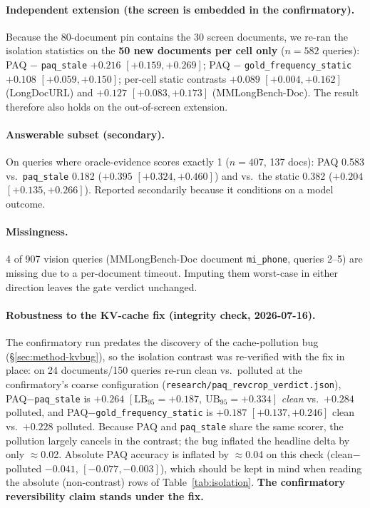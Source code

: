 \documentclass[11pt,letterpaper]{article}
\newcommand{\paq}{\textsc{PAQ}}
\newcommand{\lb}{\mathrm{LB}_{95}}
\begin{document}
\paragraph{Independent extension (the screen is embedded in the confirmatory).} Because the
80-document pin contains the 30 screen documents, we re-ran the isolation statistics on the
\textbf{50 new documents per cell only} ($n=582$ queries): \paq{} $-$ \texttt{paq\_stale}
$+0.216$ $[+0.159,+0.269]$; \paq{} $-$ \texttt{gold\_frequency\_static} $+0.108$
$[+0.059,+0.150]$; per-cell static contrasts $+0.089$ $[+0.004,+0.162]$ (LongDocURL) and
$+0.127$ $[+0.083,+0.173]$ (MMLongBench-Doc). The result therefore also holds on the
out-of-screen extension.

\paragraph{Answerable subset (secondary).} On queries where oracle-evidence scores exactly 1
($n=407$, 137 docs): \paq{} 0.583 vs.\ \texttt{paq\_stale} 0.182 ($+0.395$ $[+0.324,+0.460]$)
and vs.\ the static 0.382 ($+0.204$ $[+0.135,+0.266]$). Reported secondarily because it
conditions on a model outcome.

\label{sec:results-missing}
\paragraph{Missingness.} 4 of 907 vision queries (MMLongBench-Doc document \texttt{mi\_phone},
queries 2--5) are missing due to a per-document timeout. Imputing them worst-case in either
direction leaves the gate verdict unchanged.

\paragraph{Robustness to the KV-cache fix (integrity check, 2026-07-16).} The confirmatory run
predates the discovery of the cache-pollution bug (\S\ref{sec:method-kvbug}), so the isolation
contrast was re-verified with the fix in place: on 24 documents/150 queries re-run clean vs.\
polluted at the confirmatory's coarse configuration
(\texttt{research/paq\_revcrop\_verdict.json}), \paq{}$-$\texttt{paq\_stale} is
$\mathbf{+0.264}$ $[\lb=+0.187,\ \mathrm{UB}_{95}=+0.334]$ \emph{clean} vs.\ $+0.284$ polluted,
and \paq{}$-$\texttt{gold\_frequency\_static} is $+0.187$ $[+0.137, +0.246]$ clean vs.\ $+0.228$
polluted. Because \paq{} and \texttt{paq\_stale} share the same scorer, the pollution largely
cancels in the contrast; the bug inflated the headline delta by only $\approx$0.02. Absolute
\paq{} accuracy is inflated by $\approx$0.04 on this check (clean$-$polluted $-0.041$,
$[-0.077, -0.003]$), which should be kept in mind when reading the absolute (non-contrast) rows
of Table~\ref{tab:isolation}. \textbf{The confirmatory reversibility claim stands under the
fix.}
\end{document}
